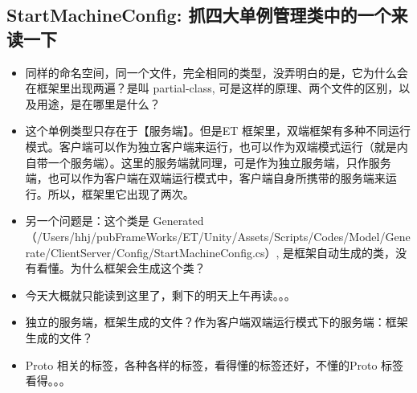 \documentclass[9pt, b5paper]{article}
\begin{document}
\subsection{StartMachineConfig: 抓四大单例管理类中的一个来读一下}
\label{sec-6-7}
\begin{itemize}
\item 同样的命名空间，同一个文件，完全相同的类型，没弄明白的是，它为什么会在框架里出现两遍？是叫 partial-class, 可是这样的原理、两个文件的区别，以及用途，是在哪里是什么？
\item 这个单例类型只存在于【服务端】。但是ET 框架里，双端框架有多种不同运行模式。客户端可以作为独立客户端来运行，也可以作为双端模式运行（就是内自带一个服务端）。这里的服务端就同理，可是作为独立服务端，只作服务端，也可以作为客户端在双端运行模式中，客户端自身所携带的服务端来运行。所以，框架里它出现了两次。
\item 另一个问题是：这个类是 Generated （/Users/hhj/pubFrameWorks/ET/Unity/Assets/Scripts/Codes/Model/Generate/ClientServer/Config/StartMachineConfig.cs）, 是框架自动生成的类，没有看懂。为什么框架会生成这个类？
\item 今天大概就只能读到这里了，剩下的明天上午再读。。。
\item 独立的服务端，框架生成的文件？作为客户端双端运行模式下的服务端：框架生成的文件？
\item Proto 相关的标签，各种各样的标签，看得懂的标签还好，不懂的Proto 标签看得。。。
\end{itemize}
\end{document}
